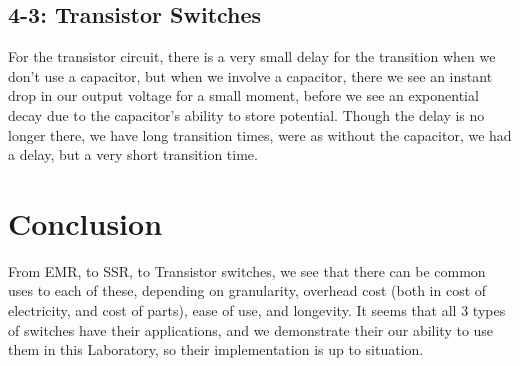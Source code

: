 \documentclass[%
 aip,
 jmp,
 amsmath,
 amssymb,
 reprint,%
 numerical,
 longbibliography,
]{revtex4-1}
\begin{document}
	\subsection{4-3: Transistor Switches}
	
	For the transistor circuit, there is a very small delay for the transition when we don't use a capacitor,
	but when we involve a capacitor, there we see an instant drop in our output voltage for a small moment, 
	before we see an exponential decay due to the capacitor's ability to store potential. Though the delay
	is no longer there, we have long transition times, were as without the capacitor, we had a delay, but
	a very short transition time.

\section{Conclusion}

From EMR, to SSR, to Transistor switches, we see that there can be common uses to each of these, depending
on granularity, overhead cost (both in cost of electricity, and cost of parts), ease of use, and longevity.
It seems that all 3 types of switches have their applications, and we demonstrate their our ability to use
them in this Laboratory, so their implementation is up to situation.
\end{document}

